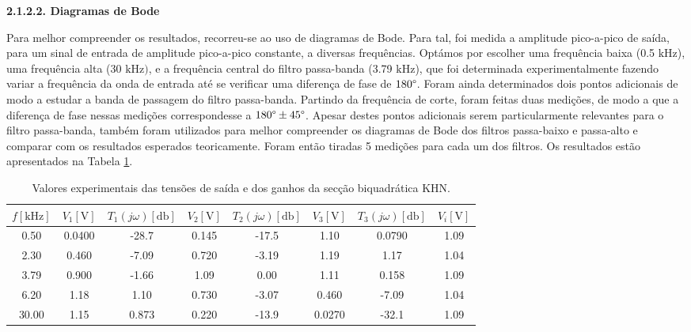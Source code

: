 \vspace{2mm}
\noindent \textbf{2.1.2.2. \hspace{1mm}Diagramas de Bode} \par
Para melhor compreender os resultados, recorreu-se ao uso de diagramas de Bode. Para tal, foi medida a amplitude pico-a-pico de saída, para um sinal de entrada de amplitude pico-a-pico constante, a diversas frequências. Optámos por escolher uma frequência baixa (0.5 $\si{\kilo \hertz}$), uma frequência alta (30 $\si{\kilo \hertz})$, e a frequência central do filtro passa-banda (3.79 $\si{\kilo \hertz}$), que foi determinada experimentalmente fazendo variar a frequência da onda de entrada até se verificar uma diferença de fase de $180\degree$. Foram ainda determinados dois pontos adicionais de modo a estudar a banda de passagem do filtro passa-banda. Partindo da frequência de corte, foram feitas duas medições, de modo a que a diferença de fase nessas medições correspondesse a $180\degree \pm 45\degree$. Apesar destes pontos adicionais serem particularmente relevantes para o filtro passa-banda, também foram utilizados para melhor compreender os diagramas de Bode dos filtros passa-baixo e passa-alto e comparar com os resultados esperados teoricamente. Foram então tiradas 5 medições para cada um dos filtros. Os resultados estão apresentados na Tabela \ref{tab:dados_bode_exp_KNH}.

\begin{table}[ht]
    \centering
    \caption{Valores experimentais das tensões de saída e dos ganhos da secção biquadrática KHN.}
    \begin{tabular}{cccccccc}
    \hline
        $f [\si{\kilo \hertz}]$ & $V_1 [\si{\volt}]$ & $T_1 (j \omega) [\si{\decibel}]$ & $V_2 [\si{\volt}]$ & $T_2 (j \omega)  [\si{\decibel}]$ & $V_3 [\si{\volt}]$ & $T_3 (j \omega) [\si{\decibel}]$ & $V_i[\si{\volt}] $\\
        \hline
        0.50   & 0.0400 & -28.7 & 0.145  & -17.5     & 1.10  & 0.0790  & 1.09\\
        2.30   &0.460 & -7.09 & 0.720  & -3.19     & 1.19  & 1.17  & 1.04\\
        3.79   &0.900 & -1.66 & 1.09  & 0.00     & 1.11  & 0.158 & 1.09\\
        6.20  &1.18 & 1.10 & 0.730  & -3.07     & 0.460  & -7.09  & 1.04\\
        30.00  &1.15 & 0.873 & 0.220  & -13.9    & 0.0270  & -32.1  & 1.09\\
    \hline
    \end{tabular}
    \label{tab:dados_bode_exp_KNH}
\end{table}
\par 


